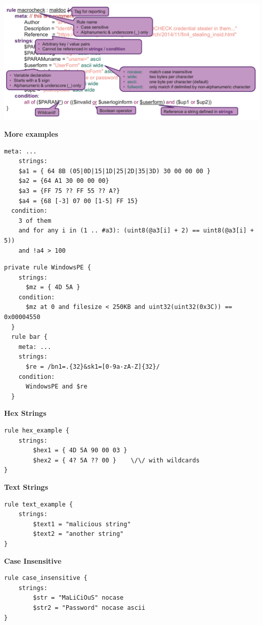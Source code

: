 \begin{center}
  \includegraphics[width=\textwidth]{resources/08-yara-rules-example.png}
\end{center}
\textbf{More examples}

\begin{lstlisting}[language=YARA]
  meta: ...
    strings:
    $a1 = { 64 8B (05|0D|15|1D|25|2D|35|3D) 30 00 00 00 }
    $a2 = {64 A1 30 00 00 00}
    $a3 = {FF 75 ?? FF 55 ?? A?}
    $a4 = {68 [-3] 07 00 [1-5] FF 15}
  condition:
    3 of them
    and for any i in (1 .. #a3): (uint8(@a3[i] + 2) == uint8(@a3[i] + 5))
    and !a4 > 100
\end{lstlisting}

\begin{lstlisting}[language=YARA]
  private rule WindowsPE {
    strings:
      $mz = { 4D 5A }
    condition:
      $mz at 0 and filesize < 250KB and uint32(uint32(0x3C)) == 0x00004550
  }
  rule bar {
    meta: ...
    strings:
      $re = /bn1=.{32}&sk1=[0-9a-zA-Z]{32}/
    condition:
      WindowsPE and $re
  }
\end{lstlisting}

\textbf{Hex Strings}
\begin{lstlisting}[language=YARA]
rule hex_example {
    strings:
        $hex1 = { 4D 5A 90 00 03 }
        $hex2 = { 4? 5A ?? 00 }    \/\/ with wildcards
}
\end{lstlisting}

\textbf{Text Strings}
\begin{lstlisting}[language=YARA]
rule text_example {
    strings:
        $text1 = "malicious string"
        $text2 = "another string"
}
\end{lstlisting}

\textbf{Case Insensitive}
\begin{lstlisting}[language=YARA]
rule case_insensitive {
    strings:
        $str = "MaLiCiOuS" nocase
        $str2 = "Password" nocase ascii
}
\end{lstlisting}

